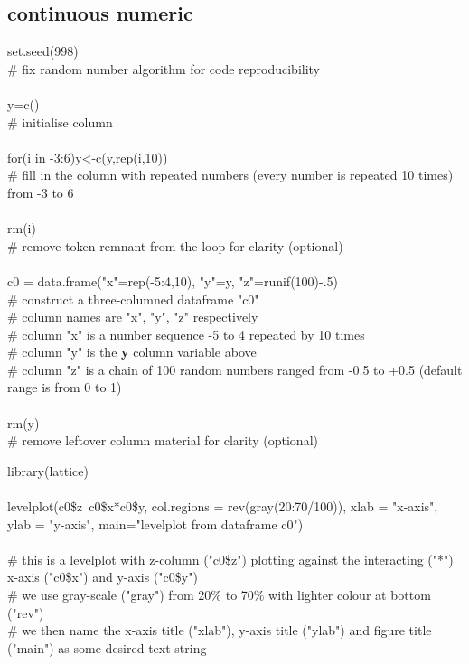 \documentclass[../note.tex]{subfiles} %
\begin{document}
\subsection{continuous numeric}
\begin{code}
set.seed(998)\\
\# fix random number algorithm for code reproducibility\\\\
y=c()\\
\# initialise column\\\\
for(i in -3:6){y<-c(y,rep(i,10))}\\
\# fill in the column with repeated numbers (every number is repeated 10 times) from -3 to 6\\\\
rm(i)\\
\# remove token remnant from the loop for clarity (optional)\\\\
c0 = data.frame("x"=rep(-5:4,10), "y"=y, "z"=runif(100)-.5)\\
\# construct a three-columned dataframe "c0"\\
\# column names are "x", "y", "z" respectively\\
\# column "x" is a number sequence -5 to 4 repeated by 10 times\\
\# column "y" is the \textbf{y} column variable above\\
\# column "z" is a chain of 100 random numbers ranged from -0.5 to +0.5 (default range is from 0 to 1)\\\\
rm(y)\\
\# remove leftover column material for clarity (optional)
\end{code}

\begin{code}
library(lattice)\\\\
levelplot(c0\$z~c0\$x*c0\$y, col.regions = rev(gray(20:70/100)), xlab = "x-axis", ylab = "y-axis", main="levelplot from dataframe c0")\\\\
\# this is a levelplot with z-column ("c0\$z") plotting against the interacting ("*") x-axis ("c0\$x") and y-axis ("c0\$y")\\
\# we use gray-scale ("gray") from 20\% to 70\% with lighter colour at bottom ("rev")\\
\# we then name the x-axis title ("xlab"), y-axis title ("ylab") and figure title ("main") as some desired text-string
\end{code}
\end{document}
